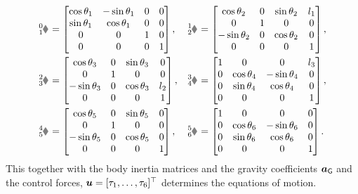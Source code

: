 \begin{align}
 \bodyHomoCoord{0}{1}{}{} &=
 \begin{bmatrix}
  \cos\jointAngle[1] & -\sin\jointAngle[1] & 0 & 0 \\
  \sin\jointAngle[1] &  \cos\jointAngle[1] & 0 & 0 \\
  0 & 0 & 1 & 0 \\
  0 & 0 & 0 & 1
 \end{bmatrix},&
 \bodyHomoCoord{1}{2}{}{} &=
 \begin{bmatrix}
  \cos\jointAngle[2] & 0 & \sin\jointAngle[2] & l_1 \\
  0 & 1 & 0 & 0 \\
  -\sin\jointAngle[2] & 0 & \cos\jointAngle[2] & 0 \\
  0 & 0 & 0 & 1
 \end{bmatrix},
\nonumber\\
 \bodyHomoCoord{2}{3}{}{} &=
 \begin{bmatrix}
  \cos\jointAngle[3] & 0 & \sin\jointAngle[3] & 0 \\
  0 & 1 & 0 & 0 \\
  -\sin\jointAngle[3] & 0 & \cos\jointAngle[3] & l_2 \\
  0 & 0 & 0 & 1
 \end{bmatrix},&
 \bodyHomoCoord{3}{4}{}{} &=
 \begin{bmatrix}
  1 & 0 & 0 & l_3 \\
  0 & \cos\jointAngle[4] & -\sin\jointAngle[4] & 0 \\
  0 & \sin\jointAngle[4] &  \cos\jointAngle[4] & 0 \\
  0 & 0 & 0 & 1
 \end{bmatrix},
\nonumber\\
 \bodyHomoCoord{4}{5}{}{} &=
 \begin{bmatrix}
  \cos\jointAngle[5] & 0 & \sin\jointAngle[5] & 0 \\
  0 & 1 & 0 & 0 \\
  -\sin\jointAngle[5] & 0 & \cos\jointAngle[5] & 0 \\
  0 & 0 & 0 & 1
 \end{bmatrix},&
 \bodyHomoCoord{5}{6}{}{} &=
 \begin{bmatrix}
  1 & 0 & 0 & 0 \\
  0 & \cos\jointAngle[6] & -\sin\jointAngle[6] & 0 \\
  0 & \sin\jointAngle[6] &  \cos\jointAngle[6] & 0 \\
  0 & 0 & 0 & 1
 \end{bmatrix}
 .
\end{align}
This together with the body inertia matrices and the gravity coefficients $\boldsymbol{a}_{\mathsf{G}}$ and the control forces, $\boldsymbol{u} = [\tau_1, \ldots, \tau_6]^\top$ determines the equations of motion.

